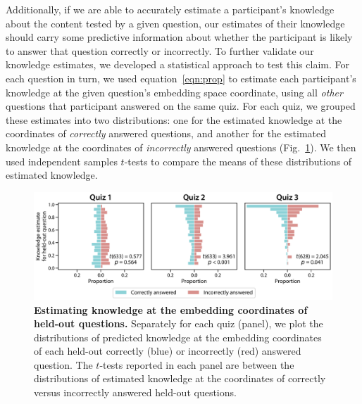\documentclass[10pt]{article}
\begin{document}
Additionally, if we are able to accurately estimate a participant's knowledge about the
content tested by a given question, our estimates of their knowledge should carry some
predictive information about whether the participant is likely to answer that
question correctly or incorrectly. To further validate our knowledge estimates, we developed a statistical approach to test this claim.
For each question in turn, we used equation~\ref{eqn:prop} to estimate each
participant's knowledge at the given question's embedding space coordinate,
using all \textit{other} questions that participant answered on the same quiz.
For
each quiz, we grouped these estimates into two distributions: one for the
estimated knowledge at the coordinates of \textit{correctly} answered
questions, and another for the estimated knowledge at the coordinates of
\textit{incorrectly} answered questions (Fig.~\ref{fig:predictions}). We then
used independent samples $t$-tests to compare the means of these distributions
of estimated knowledge.

\begin{figure}[tp]
    \centering
    \includegraphics[width=\textwidth]{figs/held-out-question-analysis}

    \caption{\textbf{Estimating knowledge at the embedding coordinates of
    held-out questions.} Separately for each quiz (panel), we plot the
    distributions of predicted knowledge at the embedding coordinates of each
    held-out correctly (blue) or incorrectly (red) answered question. The
    $t$-tests reported in each panel are between the distributions of estimated
    knowledge at the coordinates of correctly versus incorrectly answered
    held-out questions.}

    \label{fig:predictions}
\end{figure}
\end{document}
